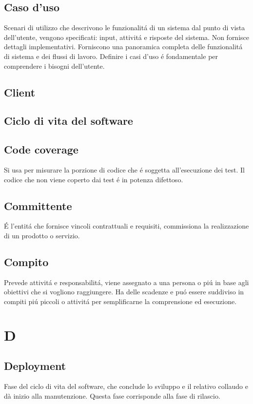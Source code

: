 \documentclass[12pt]{article}
\begin{document}
		\subsection{Caso d'uso}
			Scenari di utilizzo che descrivono le funzionalit\'a di un sistema dal punto di vista dell'utente, vengono specificati: input, attivit\'a e risposte del sistema. Non fornisce dettagli implementativi. Forniscono una panoramica completa delle funzionalit\'a di sistema e dei flussi di lavoro. Definire i casi d'uso \'e fondamentale per comprendere i bisogni dell'utente.
		\subsection{Client} %
			\subsection{Ciclo di vita del software} %
		\subsection{Code coverage}
			Si usa per misurare la porzione di codice che \'e soggetta all'esecuzione dei test. Il codice che non viene coperto dai test \'e in potenza difettoso.
		\subsection{Committente}
			\'E l'entit\'a che fornisce vincoli contrattuali e requisiti, commissiona la realizzazione di un prodotto o servizio.
		\subsection{Compito}
			Prevede attivit\'a e responsabilit\'a, viene assegnato a una persona o pi\'u in base agli obiettivi che si vogliono raggiungere. Ha delle scadenze e pu\'o essere suddiviso in compiti pi\'u piccoli o attivit\'a per semplificarne la comprensione ed esecuzione.
	\clearpage
	\section{D}
		\subsection{Deployment}
		Fase del ciclo di vita del software, che conclude lo sviluppo e il relativo collaudo e dà inizio alla manutenzione. Questa fase corrisponde alla fase di rilascio.
\end{document}
